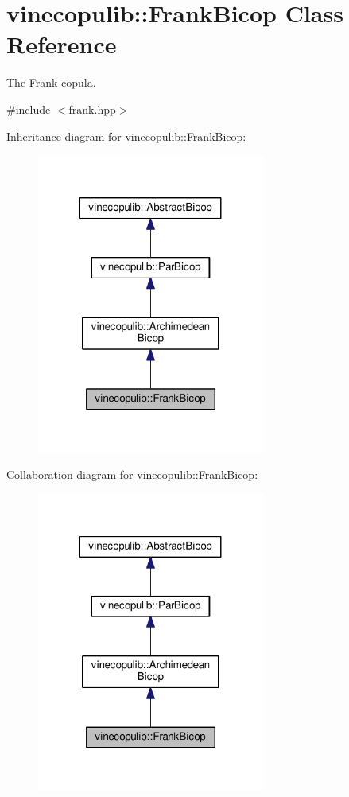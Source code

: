 \hypertarget{classvinecopulib_1_1_frank_bicop}{\section{vinecopulib\+:\+:Frank\+Bicop Class Reference}
\label{classvinecopulib_1_1_frank_bicop}
}


The Frank copula.  




{\ttfamily \#include $<$frank.\+hpp$>$}



Inheritance diagram for vinecopulib\+:\+:Frank\+Bicop\+:\nopagebreak
\begin{figure}[H]
\begin{center}
\leavevmode
\includegraphics[width=212pt]{classvinecopulib_1_1_frank_bicop__inherit__graph}
\end{center}
\end{figure}


Collaboration diagram for vinecopulib\+:\+:Frank\+Bicop\+:\nopagebreak
\begin{figure}[H]
\begin{center}
\leavevmode
\includegraphics[width=212pt]{classvinecopulib_1_1_frank_bicop__coll__graph}
\end{center}
\end{figure}
